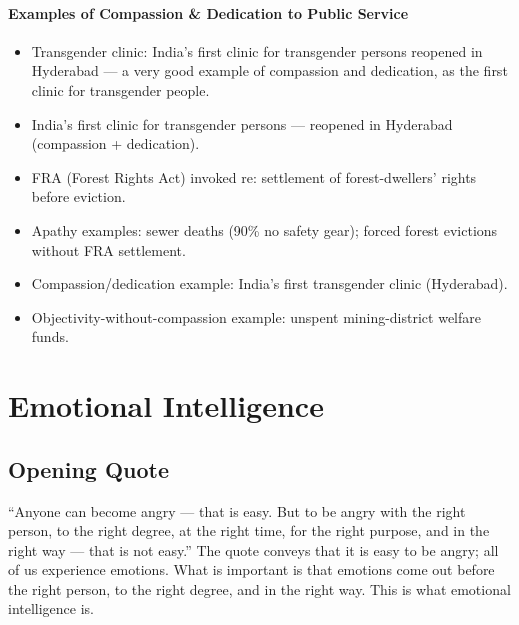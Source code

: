 \paragraph{Examples of Compassion \& Dedication to Public Service}

\begin{itemize}
\item Transgender clinic: India's first clinic for transgender persons reopened in Hyderabad --- a very good example of compassion and dedication, as the first clinic for transgender people.
\end{itemize}

\begin{GovtPolicy}
\begin{itemize}
\item India's first clinic for transgender persons --- reopened in Hyderabad (compassion + dedication).
\item FRA (Forest Rights Act) invoked re: settlement of forest-dwellers' rights before eviction.
\end{itemize}
\end{GovtPolicy}

\begin{QuickRevision}
\begin{itemize}
\item Apathy examples: sewer deaths (90\% no safety gear); forced forest evictions without FRA settlement.
\item Compassion/dedication example: India's first transgender clinic (Hyderabad).
\item Objectivity-without-compassion example: unspent mining-district welfare funds.
\end{itemize}
\end{QuickRevision}

\section{Emotional Intelligence}

\subsection{Opening Quote}

``Anyone can become angry --- that is easy. But to be angry with the right person, to the right degree, at the right time, for the right purpose, and in the right way --- that is not easy.'' The quote conveys that it is easy to be angry; all of us experience emotions. What is important is that emotions come out before the right person, to the right degree, and in the right way. This is what emotional intelligence is.

